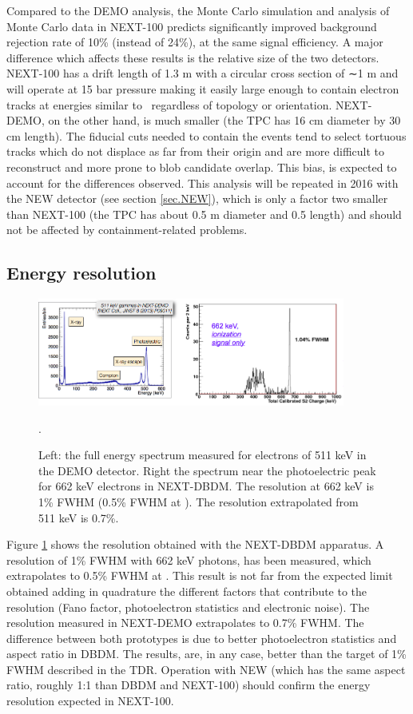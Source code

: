 Compared to the DEMO analysis, the Monte Carlo simulation and analysis of Monte Carlo data in NEXT-100
predicts significantly improved background rejection rate of 10\% (instead of 24\%), at the same signal efficiency. A major difference which affects
these results is the relative size of the two detectors. NEXT-100 has a drift length of 1.3 m
with a circular cross section of ∼1 m and will operate at 15 bar pressure making it easily
large enough to contain electron tracks at energies similar to \Qbb\ regardless of topology
or orientation. NEXT-DEMO, on the other hand, is much smaller (the TPC has 16 cm diameter by 30 cm length). The fiducial cuts needed to contain the events tend to select tortuous tracks which do not displace as far from their origin
and are more difficult to reconstruct and more prone to blob candidate overlap. This bias,
is expected to account for the differences observed. This analysis will be repeated in 2016 with the NEW detector (see section \ref{sec.NEW}), which is only a factor two smaller than NEXT-100 (the TPC has about 0.5 m diameter and 0.5 length) and should not be affected by containment-related problems. 

\subsection{Energy resolution}

\begin{figure}
\centering
\includegraphics[width=0.9\textwidth]{img2/EResolution.png}
\caption{\small Left: the full energy spectrum measured for electrons of 511 keV in the DEMO detector. Right the spectrum near the photoelectric peak for 662 keV electrons in NEXT-DBDM. The resolution at 662 keV is 1\% FWHM (0.5\% FWHM at \Qbb). The resolution extrapolated from 511 keV is 0.7\%.}\label{fig.ERES}. 
\end{figure}

Figure \ref{fig.ERES} shows the resolution obtained with the NEXT-DBDM apparatus. A resolution of 1\% FWHM with 
662 keV photons, has been measured, which extrapolates to 0.5\% FWHM at \Qbb. This result is not far from the expected limit obtained adding in quadrature the different factors that contribute to the resolution (Fano factor, photoelectron statistics and electronic noise). The resolution measured in NEXT-DEMO extrapolates to 0.7\% FWHM. The difference between both prototypes is due to better photoelectron statistics and aspect ratio in DBDM. The results, are, in any case, better than the target of 1\% FWHM described in the TDR. Operation with NEW (which has the same aspect ratio, roughly 1:1 than DBDM and NEXT-100) should confirm the energy resolution expected in NEXT-100. 

